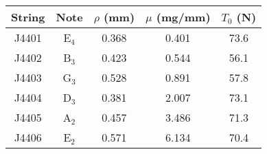 \begin{tabular}{ccccc}
\toprule
String & Note & $\rho$ (mm) & $\mu$ (mg/mm) & $T_0$ (N) \\
\midrule
J4401 & E$_{4}$ & 0.368 & 0.401 & 73.6 \\
J4402 & B$_{3}$ & 0.423 & 0.544 & 56.1 \\
J4403 & G$_{3}$ & 0.528 & 0.891 & 57.8 \\
J4404 & D$_{3}$ & 0.381 & 2.007 & 73.1 \\
J4405 & A$_{2}$ & 0.457 & 3.486 & 71.3 \\
J4406 & E$_{2}$ & 0.571 & 6.134 & 70.4 \\
\bottomrule
\end{tabular}

